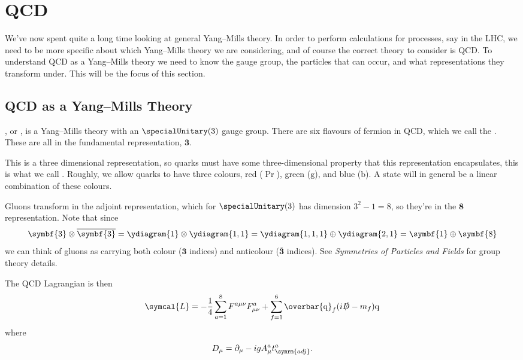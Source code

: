\documentclass[fleqn]{NotesClass}
\newcommand*{\course}[1]{\textit{#1}}
\newcommand{\Pparticle}[1]{\mathrm{#1}}
\newcommand{\Pb}{\ensuremath{\Pparticle{b}}}
\newcommand{\Pg}{\ensuremath{\Pparticle{g}}}
\newcommand{\Pq}{\ensuremath{\Pparticle{q}}}
\newcommand{\diracadjoint}[1]{\overbar{#1}}
\newcommand{\covariantDerivative}{D}
\newcommand{\lagrangianDensity}{\symcal{L}}
\newcommand{\adj}{\symrm{adj}}
\newcommand{\rep}[1]{\symbf{#1}}
\begin{document}
    \chapter{QCD}
    We've now spent quite a long time looking at general Yang--Mills theory.
    In order to perform calculations for processes, say in the LHC, we need to be more specific about which Yang--Mills theory we are considering, and of course the correct theory to consider is QCD.
    To understand QCD as a Yang--Mills theory we need to know the gauge group, the particles that can occur, and what representations they transform under.
    This will be the focus of this section.
    
    \section{QCD as a Yang--Mills Theory}
    , or , is a Yang--Mills theory with an \(\specialUnitary(3)\) gauge group.
    There are six flavours of fermion in QCD, which we call the .
    These are all in the fundamental representation, \(\rep{3}\).
    
    This is a three dimensional representation, so quarks must have some three-dimensional property that this representation encapsulates, this is what we call .
    Roughly, we allow quarks to have three colours, red (\(\Pr\)), green (\(\Pg\)), and blue (\(\Pb\)).
    A state will in general be a linear combination of these colours.
    
    Gluons transform in the adjoint representation, which for \(\specialUnitary(3)\) has dimension \(3^2 - 1 = 8\), so they're in the \(\rep{8}\) representation.
    Note that since
    \begin{equation}
        \rep{3} \otimes \overline{\rep{3}} = \ydiagram{1} \otimes \ydiagram{1,1} = \ydiagram{1,1,1} \oplus \ydiagram{2,1} = \rep{1} \oplus \rep{8}
    \end{equation}
    we can think of gluons as carrying both colour (\(\rep{3}\) indices) and anticolour (\(\overline{\rep{3}}\) indices).
    See \course{Symmetries of Particles and Fields} for group theory details.
    
    The QCD Lagrangian is then
    \begin{equation}
        \lagrangianDensity = -\frac{1}{4}\sum_{a=1}^{8} F^{a\mu\nu}F^a_{\mu\nu} + \sum_{f = 1}^{6} \diracadjoint{\Pq}_f(i\slashed{\covariantDerivative} - m_{f})\Pq
    \end{equation}
    where
    \begin{equation}
        \covariantDerivative_\mu = \partial_\mu - igA^a_\mu t_{\adj}^a.
    \end{equation}
    
\end{document}

